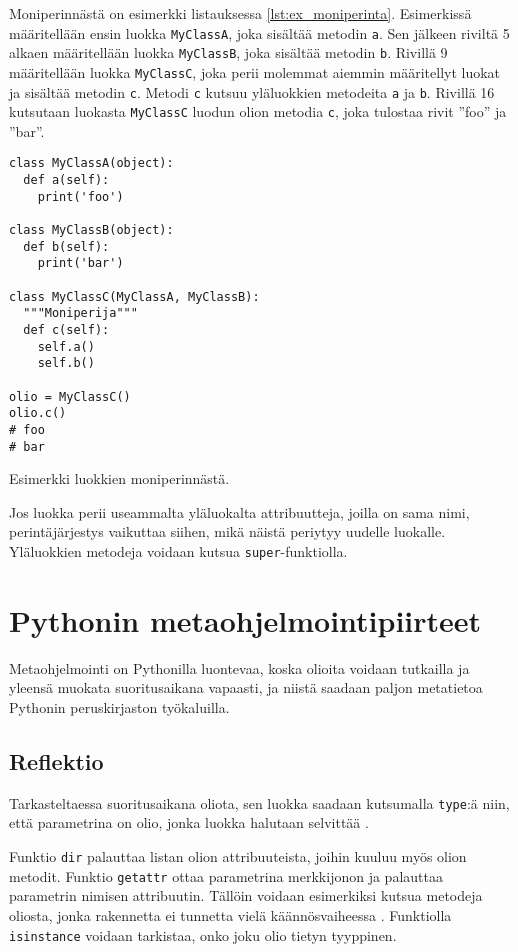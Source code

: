 \documentclass[finnish]{tktltiki2}
\theoremstyle{definition}
\theoremstyle{remark}
\begin{document}
Moniperinnästä on esimerkki listauksessa \ref{lst:ex_moniperinta}. Esimerkissä määritellään ensin luokka \verb|MyClassA|, joka sisältää metodin \verb|a|. Sen jälkeen riviltä 5 alkaen määritellään luokka \verb|MyClassB|, joka sisältää metodin \verb|b|. Rivillä 9 määritellään luokka \verb|MyClassC|, joka perii molemmat aiemmin määritellyt luokat ja sisältää metodin \verb|c|. Metodi \verb|c| kutsuu yläluokkien metodeita \verb|a| ja \verb|b|. Rivillä 16 kutsutaan luokasta \verb|MyClassC| luodun olion metodia \verb|c|, joka tulostaa rivit ''foo'' ja ''bar''.

\begin{listing}[ht]
\begin{verbatim}
class MyClassA(object):
  def a(self):
    print('foo')

class MyClassB(object):
  def b(self):
    print('bar')

class MyClassC(MyClassA, MyClassB):
  """Moniperija"""
  def c(self):
    self.a()
    self.b()

olio = MyClassC()
olio.c()
# foo    
# bar
\end{verbatim}
    \caption{Esimerkki luokkien moniperinnästä.}
    \label{lst:ex_moniperinta}
\end{listing}

Jos luokka perii useammalta yläluokalta attribuutteja, joilla on sama nimi, perintäjärjestys vaikuttaa siihen, mikä näistä periytyy uudelle luokalle. Yläluokkien metodeja voidaan kutsua \verb|super|-funktiolla.

\section{Pythonin metaohjelmointipiirteet}

Metaohjelmointi on Pythonilla luontevaa, koska olioita voidaan tutkailla ja yleensä muokata suoritusaikana vapaasti, ja niistä saadaan paljon metatietoa Pythonin peruskirjaston työkaluilla.

\subsection{Reflektio}

Tarkasteltaessa suoritusaikana oliota, sen luokka saadaan kutsumalla \verb|type|:ä niin, että parametrina on olio, jonka luokka halutaan selvittää \cite{dive-into-python}. 

Funktio \verb|dir| palauttaa listan olion attribuuteista, joihin kuuluu myös olion metodit. Funktio \verb|getattr| ottaa parametrina merkkijonon ja palauttaa parametrin nimisen attribuutin. Tällöin voidaan esimerkiksi kutsua metodeja oliosta, jonka rakennetta ei tunnetta vielä käännösvaiheessa \cite{dive-into-python}. Funktiolla \verb|isinstance| voidaan tarkistaa, onko joku olio tietyn tyyppinen. 
\end{document}
